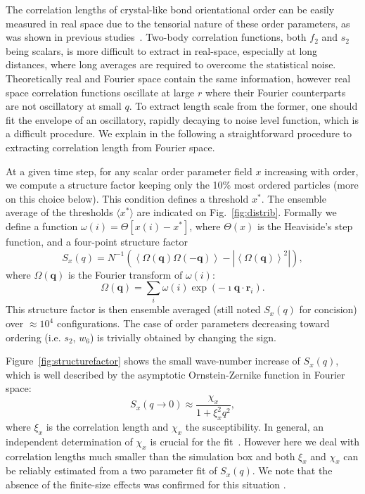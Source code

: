 \documentclass[twocolumn,superscriptaddress]{revtex4}
\begin{document}
The correlation lengths of crystal-like bond orientational order can be easily measured in real space due to the tensorial nature
of these order parameters, as was shown in previous studies~\cite{tanaka,kawasaki,mathieu_icosahedra,russo_gcm,russo_hs}. Two-body
correlation functions, both $f_2$ and $s_2$ being scalars, is more difficult to extract in real-space, especially at long distances,
where long averages are required to overcome the statistical noise. Theoretically real and Fourier space contain the same information, however real space correlation functions oscillate at large $r$ where their Fourier counterparts are not oscillatory at small $q$. To extract length scale from the former, one should fit the envelope of an oscillatory, rapidly decaying to noise level function, which is a difficult procedure. We explain in the following a straightforward procedure to extracting correlation length from Fourier space.

At a given time step, for any scalar order parameter field $x$ increasing with order, we compute a structure factor keeping only the 10\% most ordered particles (more on this choice below). This condition defines a threshold $x^*$. The ensemble average of the thresholds $\langle x^*\rangle$ are indicated on Fig.~\ref{fig:distrib}. Formally we define a function $\omega(i) = \Theta [x(i) - x^*]$, where $\Theta(x)$ is the Heaviside’s step function, and a four-point structure factor
\begin{equation}
	S_x(q) = N^{-1}(\left\langle \Omega(\mathbf{q}) \Omega(-\mathbf{q}) \right\rangle - | \left\langle \Omega(\mathbf{q}) \right\rangle^2 |),   
	\label{eq:StrutureFactor}
\end{equation}
where $\Omega(\mathbf{q})$ is the Fourier transform of $\omega(i)$: 
\begin{equation}
	\Omega(\mathbf{q}) = \sum_i \omega(i)\exp(-\imath \mathbf{q}\cdot\mathbf{r}_i).  
\end{equation}
This structure factor is then ensemble averaged (still noted $S_x(q)$ for concision) over $\approx 10^4$ configurations. The case of order parameters decreasing toward ordering (i.e. $s_2$, $w_6$) is trivially obtained by changing the sign.

Figure~\ref{fig:structurefactor} shows the small wave-number increase of $S_x(q)$, which is well described by the asymptotic Ornstein-Zernike function in Fourier space:
\begin{equation}
	S_x(q\rightarrow 0) \approx \frac{\chi_x}{1+\xi_x^2 q^2},
	\label{eq:OZ_Fourier}
\end{equation}
where $\xi_x$ is the correlation length and $\chi_x$ the susceptibility. In general, an independent determination of $\chi_x$ is crucial for the fit~\cite{Flenner2011}. However here we deal with correlation lengths much smaller than the simulation box and both $\xi_x$ and $\chi_x$ can be reliably estimated from a two parameter fit of $S_x(q)$. 
We note that the absence of the finite-size effects was confirmed for this situation \cite{tanaka}.  
\end{document}
